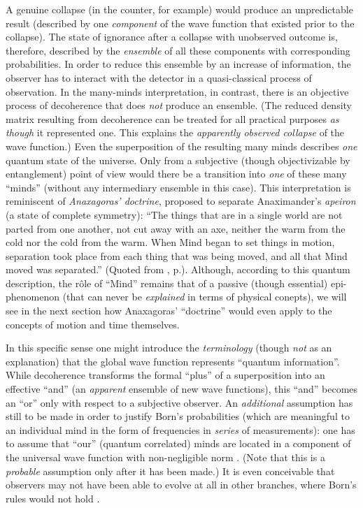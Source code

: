 A genuine collapse (in the counter, for example) would produce an
unpredictable result (described by one {\it component} of the
wave function that existed prior to the collapse). The state of
ignorance after a collapse with unobserved outcome is, therefore,
described by the {\it ensemble} of all these components with
corresponding probabilities. In order to reduce this ensemble by an
increase of information, the observer has to interact with the
detector in a quasi-classical process of observation. In the many-minds
interpretation, in contrast, there is an objective process of
decoherence that does {\it not} produce an ensemble. (The reduced
density matrix resulting from decoherence can be treated for all
practical purposes {\it as though} it represented one. This explains
the {\it apparently observed collapse} of the wave function.) Even the
superposition of the resulting many minds describes {\it one} quantum
state of the universe. Only from a subjective (though objectivizable
by entanglement) point of view would there be a transition into {\it
one} of these many ``minds'' (without any intermediary ensemble in
this case). This interpretation is reminiscent of {\it Anaxagoras'
doctrine}, proposed to separate Anaximander's  {\it apeiron} (a state
of complete symmetry): ``The things that are in a single world are not
parted from one another, not cut away with an axe, neither the warm
from the cold nor the cold from the warm. When Mind began to set
things in motion, separation took place from each thing that was being
moved, and all that Mind moved was separated.'' (Quoted from
\cite{Jammer}, p.). Although, according to this quantum
description, the r\^ole of ``Mind'' remains that of a passive (though
essential) epi-phenomenon (that can never be {\it explained} in terms
of physical conepts), we will see in the next section how Anaxagoras'
``doctrine'' would even apply to the concepts of motion and time
themselves.
 
In this specific sense one might introduce the {\it terminology}
(though {\it not} as an explanation) that the global wave function
represents ``quantum information''. While decoherence transforms the
formal ``plus'' of a superposition into an effective ``and'' (an {\it
apparent} ensemble of new wave functions), this ``and'' becomes an
``or'' only with respect to a subjective observer. An {\it additional}
assumption has still to be made in order to justify Born's
probabilities (which are meaningful to an individual mind in the form
of frequencies in {\it series} of measurements): one has to assume
that ``our'' (quantum correlated) minds are located in a component of
the universal wave function with non-negligible norm
\cite{graham}. (Note that this is a {\it probable} assumption only
after it has been made.) It is even conceivable that observers may not
have been able to evolve at all in other branches, where
Born's rules would not hold
\cite{Saunders}.


